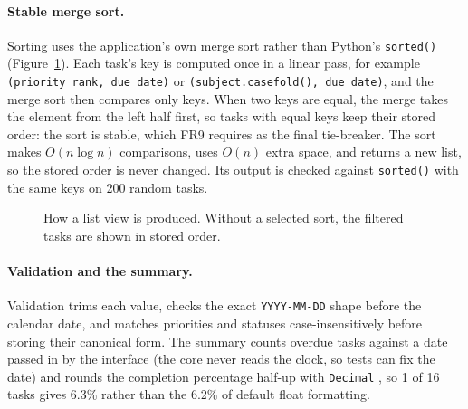 \documentclass[11pt,a4paper]{article}
\newcommand{\code}[1]{\texttt{#1}}
\begin{document}
\paragraph{Stable merge sort.} Sorting uses the application's own merge sort
rather than Python's \code{sorted()} (Figure~\ref{fig:pipeline}). Each task's
key is computed once in a linear pass, for example
\code{(priority rank, due date)} or \code{(subject.casefold(), due date)},
and the merge sort then compares only keys. When two keys are equal, the merge
takes the element from the left half first, so tasks with equal keys keep
their stored order: the sort is stable, which FR9 requires as the final
tie-breaker. The sort makes $O(n \log n)$ comparisons, uses $O(n)$ extra space,
and returns a new list, so the stored order is never changed. Its output is
checked against \code{sorted()} with the same keys on 200 random tasks.

\begin{figure}[ht]
\centering
{}
\caption{How a list view is produced. Without a selected sort, the filtered
tasks are shown in stored order.}
\label{fig:pipeline}
\end{figure}

\paragraph{Validation and the summary.} Validation trims each value, checks
the exact \code{YYYY-MM-DD} shape before the calendar date, and matches
priorities and statuses case-insensitively before storing their canonical
form. The summary counts overdue tasks against a date passed in by the
interface (the core never reads the clock, so tests can fix the date) and
rounds the completion percentage half-up with \code{Decimal}
\parencite{python-decimal}, so 1 of 16
tasks gives 6.3\% rather than the 6.2\% of default float formatting.
\end{document}
